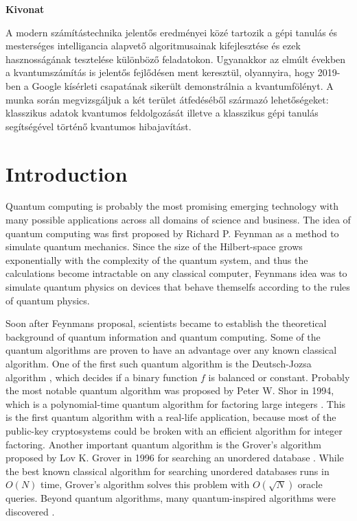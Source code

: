 \documentclass[12pt, a4paper,  nobibnotes]{article}
\begin{document}
\begin{center}
    \textbf{Kivonat}\\
    \par A modern számítástechnika jelentős eredményei közé tartozik a gépi
    tanulás és mesterséges intelligancia alapvető algoritmusainak kifejlesztése és ezek 
    hasznosságának tesztelése különböző feladatokon. Ugyanakkor az elmúlt években a 
    kvantumszámítás is jelentős fejlődésen ment keresztül, olyannyira, hogy 2019-ben a Google kísérleti
    csapatának sikerült demonstrálnia a kvantumfölényt. A munka során megvizsgáljuk a két terület átfedéséből 
    származó lehetőségeket: klasszikus adatok kvantumos feldolgozását illetve a klasszikus
    gépi tanulás segítségével történő kvantumos hibajavítást.
\end{center}
\thispagestyle{empty} %
\newpage

\thispagestyle{empty}
\tableofcontents
\newpage

\thispagestyle{empty}
\listoffigures
\newpage

\section{Introduction}
Quantum computing is probably the most promising emerging technology with many possible applications across
all domains of science and business. The idea of quantum computing was first proposed by Richard P. Feynman
as a method to simulate quantum mechanics. Since the size of the Hilbert-space grows exponentially with
the complexity of the quantum system, and thus the calculations become intractable on any classical
computer, Feynmans idea was to simulate quantum physics on devices that behave themselfs according to 
the rules of quantum physics.
\par
Soon after Feynmans proposal, scientists became to establish the theoretical background of quantum
information and quantum computing. Some of the quantum algorithms are proven to have an 
advantage over any known classical algorithm. One of the first such quantum algorithm is 
the Deutsch-Jozsa algorithm \cite{DeutschJozsa1992}, which decides if a binary function $f$ 
is balanced or constant. Probably the most notable quantum algorithm was proposed by Peter W. Shor 
in 1994, which is a polynomial-time quantum algorithm for factoring large integers \cite{Shor1994}.
This is the first quantum algorithm with a real-life application, because most of the public-key
cryptosystems could be broken with an efficient algorithm for integer factoring. 
Another important quantum algorithm is the Grover's algorithm proposed by Lov K. Grover in 1996 for
searching an unordered database \cite{Grover1996}. While the best known classical algorithm 
for searching unordered databases runs in $O(N)$ time, Grover's algorithm solves this problem
with $O(\sqrt N)$ oracle queries. Beyond quantum algorithms, many quantum-inspired algorithms were 
discovered \cite{Tang2019,Ding2019QuantumInspiredSVM,ArrazolaQuantumInspired2019}.
\end{document}
